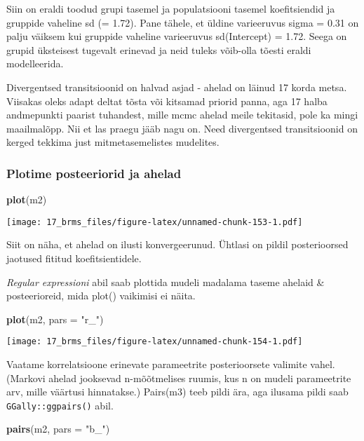 \documentclass[]{article}
\newenvironment{Shaded}{\begin{snugshade}}{\end{snugshade}}
\newcommand{\KeywordTok}[1]{\textcolor[rgb]{0.13,0.29,0.53}{\textbf{#1}}}
\newcommand{\DataTypeTok}[1]{\textcolor[rgb]{0.13,0.29,0.53}{#1}}
\newcommand{\StringTok}[1]{\textcolor[rgb]{0.31,0.60,0.02}{#1}}
\newcommand{\NormalTok}[1]{#1}
\begin{document}
Siin on eraldi toodud grupi tasemel ja populatsiooni tasemel
koefitsiendid ja gruppide vaheline sd (= 1.72). Pane tähele, et üldine
varieeruvus sigma = 0.31 on palju väiksem kui gruppide vaheline
varieeruvus sd(Intercept) = 1.72. Seega on grupid üksteisest tugevalt
erinevad ja neid tuleks võib-olla tõesti eraldi modelleerida.

Divergentsed transitsioonid on halvad asjad - ahelad on läinud 17 korda
metsa. Viisakas oleks adapt deltat tõsta või kitsamad priorid panna, aga
17 halba andmepunkti paarist tuhandest, mille mcmc ahelad meile
tekitasid, pole ka mingi maailmalõpp. Nii et las praegu jääb nagu on.
Need divergentsed transitsioonid on kerged tekkima just
mitmetasemelistes mudelites.

\subsubsection{Plotime posteeriorid ja
ahelad}\label{plotime-posteeriorid-ja-ahelad}

\begin{Shaded}
\begin{Highlighting}[]
\KeywordTok{plot}\NormalTok{(m2)}
\end{Highlighting}
\end{Shaded}

\texttt{[image: 17\_brms\_files/figure-latex/unnamed-chunk-153-1.pdf]}

Siit on näha, et ahelad on ilusti konvergeerunud. Ühtlasi on pildil
posterioorsed jaotused fititud koefitsientidele.

\emph{Regular expressioni} abil saab plottida mudeli madalama taseme
ahelaid \& posteerioreid, mida plot() vaikimisi ei näita.

\begin{Shaded}
\begin{Highlighting}[]
\KeywordTok{plot}\NormalTok{(m2, }\DataTypeTok{pars =} \StringTok{"r_"}\NormalTok{)}
\end{Highlighting}
\end{Shaded}

\texttt{[image: 17\_brms\_files/figure-latex/unnamed-chunk-154-1.pdf]}

Vaatame korrelatsioone erinevate parameetrite posterioorsete valimite
vahel. (Markovi ahelad jooksevad n-mõõtmelises ruumis, kus n on mudeli
parameetrite arv, mille väärtusi hinnatakse.) Pairs(m3) teeb pildi ära,
aga ilusama pildi saab \texttt{GGally::ggpairs()} abil.

\begin{Shaded}
\begin{Highlighting}[]
\KeywordTok{pairs}\NormalTok{(m2, }\DataTypeTok{pars =} \StringTok{"b_"}\NormalTok{)}
\end{Highlighting}
\end{Shaded}
\end{document}

